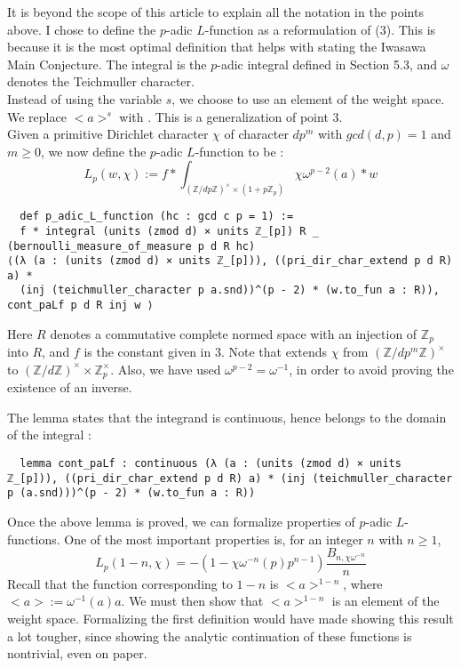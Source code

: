 \documentclass[11pt]{article}
\begin{document}
It is beyond the scope of this article to explain all the notation in the points above. I chose to
define the $p$-adic $L$-function as a reformulation of (3). This is because it is the most optimal
definition that helps with stating the Iwasawa Main Conjecture. The integral is the $p$-adic integral
defined in Section 5.3, and $\omega$ denotes the Teichmuller character. \\

Instead of using the variable $s$, we choose to use an element of the weight space. We replace
$<a>^s$ with . This is a generalization of point 3. \\

Given a primitive Dirichlet character $\chi$ of character $dp^m$ with $gcd(d, p) = 1$ and $m \ge 0$,
we now define the $p$-adic $L$-function to be :
$$ L_p(w, \chi) := f * \int_{(\mathbb{Z}/dp \mathbb{Z})^{\times} \times (1 + p \mathbb{Z}_p)}
\chi \omega^{p - 2} (a) * w $$
\begin{lstlisting}
  def p_adic_L_function (hc : gcd c p = 1) :=
  f * integral (units (zmod d) × units ℤ_[p]) R _ (bernoulli_measure_of_measure p d R hc)
⟨(λ (a : (units (zmod d) × units ℤ_[p])), ((pri_dir_char_extend p d R) a) *
  (inj (teichmuller_character p a.snd))^(p - 2) * (w.to_fun a : R)), cont_paLf p d R inj w ⟩
\end{lstlisting}

Here $R$ denotes a commutative complete normed space with an injection  of $\mathbb{Z}_p$
into $R$, and $f$ is the constant given in 3. Note that  extends $\chi$
from $(\mathbb{Z}/ dp^m \mathbb{Z})^{\times}$ to $(\mathbb{Z}/ d \mathbb{Z})^{\times} \times \mathbb{Z}_p^{\times}$. Also, we have
used $\omega^{p-2} = \omega^{-1}$, in order to avoid proving the existence of an inverse.

The lemma  states that the integrand is continuous, hence belongs to the domain
of the integral :
\begin{lstlisting}
  lemma cont_paLf : continuous (λ (a : (units (zmod d) × units ℤ_[p])), ((pri_dir_char_extend p d R) a) * (inj (teichmuller_character p (a.snd)))^(p - 2) * (w.to_fun a : R))
\end{lstlisting}

Once the above lemma is proved, we can formalize properties of $p$-adic $L$-functions. One of the most
important properties is, for an integer $n$ with $n \ge 1$,
$$ L_p (1 - n, \chi) = -(1 - \chi \omega^{-n}(p)p^{n - 1}) \frac{B_{n, \chi \omega^{-n}}}{n} $$
Recall that the function corresponding to $1 - n$ is $<a>^{1 - n}$, where $<a> := \omega ^{-1}(a) a$.
We must then show that $<a>^{1 - n}$ is an element of the weight space. Formalizing the first definition
would have made showing this result a lot tougher, since showing the analytic continuation of these
functions is nontrivial, even on paper.
\end{document}
